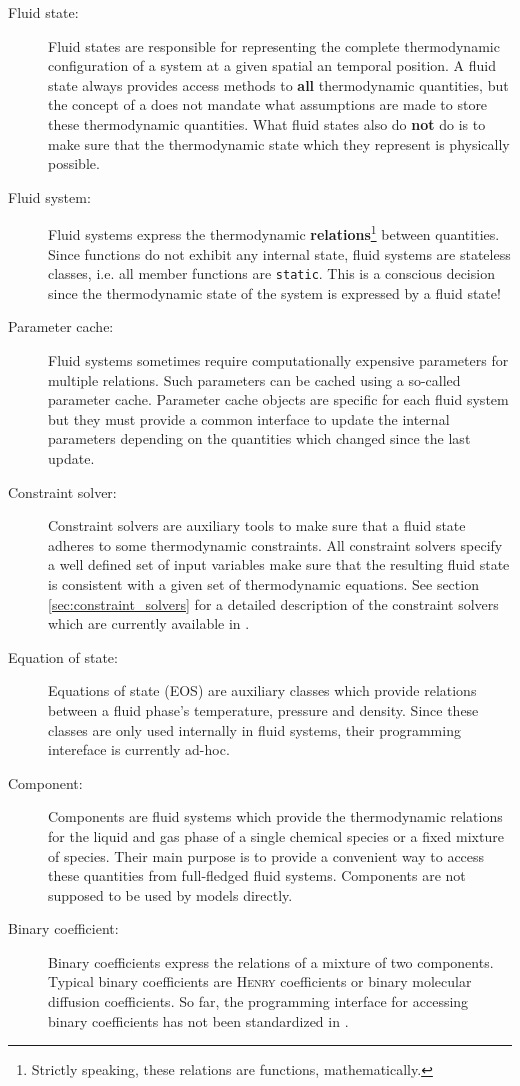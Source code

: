 \begin{description}
\item[Fluid state:] Fluid states are responsible for representing the
  complete thermodynamic configuration of a system at a given spatial
  an temporal position. A fluid state always provides access methods
  to {\bf all} thermodynamic quantities, but the concept of a does not
  mandate what assumptions are made to store these thermodynamic
  quantities. What fluid states also do {\bf not} do is to make sure
  that the thermodynamic state which they represent is physically
  possible.
\item[Fluid system:] Fluid systems express the thermodynamic {\bf
    relations}\footnote{Strictly speaking, these relations are
    functions, mathematically.} between quantities. Since functions do
  not exhibit any internal state, fluid systems are stateless classes,
  i.e. all member functions are \texttt{static}. This is a conscious
  decision since the thermodynamic state of the system is expressed by
  a fluid state!
\item[Parameter cache:] Fluid systems sometimes require
  computationally expensive parameters for multiple relations. Such
  parameters can be cached using a so-called parameter
  cache. Parameter cache objects are specific for each fluid system
  but they must provide a common interface to update the internal
  parameters depending on the quantities which changed since the last
  update.
\item[Constraint solver:] Constraint solvers are auxiliary tools to
  make sure that a fluid state adheres to some thermodynamic
  constraints. All constraint solvers specify a well defined set of
  input variables make sure that the resulting fluid state is
  consistent with a given set of thermodynamic equations. See section
  \ref{sec:constraint_solvers} for a detailed description of the
  constraint solvers which are currently available in \Dumux.
\item[Equation of state:] Equations of state (EOS) are auxiliary
  classes which provide relations between a fluid phase's temperature,
  pressure and density. Since these classes are only used internally
  in fluid systems, their programming intereface is currently ad-hoc.
\item[Component:] Components are fluid systems which provide the
  thermodynamic relations for the liquid and gas phase of a single
  chemical species or a fixed mixture of species. Their main purpose
  is to provide a convenient way to access these quantities from
  full-fledged fluid systems. Components are not supposed to be used
  by models directly.
\item[Binary coefficient:] Binary coefficients express the relations
  of a mixture of two components. Typical binary coefficients are
  \textsc{Henry} coefficients or binary molecular diffusion
  coefficients. So far, the programming interface for accessing binary
  coefficients has not been standardized in \Dumux.
\end{description}

